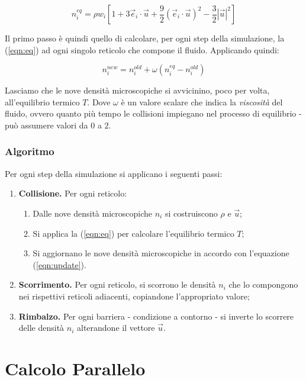 \documentclass[12pt]{article}
\begin{document}
\begin{equation}
\label{eqn:eq}
    n^{eq}_i = \rho w_i [1 + 3 \vec{e}_i \cdot \vec{u} + \frac{9}{2}(\vec{e}_i \cdot \vec{u})^2 - \frac{3}{2}|\vec{u}|^2] 
\end{equation}

Il primo passo è quindi quello di calcolare, per ogni step della simulazione, la (\ref{eqn:eq}) ad ogni singolo reticolo che compone il fluido.
Applicando quindi:

\begin{equation}
\label{eqn:update}
    n^{new}_i = n^{old}_i + \omega (n^{eq}_i - n^{old}_i)
\end{equation}

Lasciamo che le nove densità microscopiche si avvicinino, poco per volta, all'equilibrio termico \(T\).
Dove \(\omega\) è un valore scalare che indica la \textit{viscosità} del fluido, ovvero quanto più tempo le collisioni impiegano nel processo di equilibrio - può assumere valori da \(0\) a \(2\).



\subsubsection{Algoritmo}
\label{sec:alg}

Per ogni step della simulazione si applicano i seguenti passi:
\begin{enumerate}
    \item \textbf{Collisione.} Per ogni reticolo:
    \begin{enumerate}
        \item Dalle nove densità microscopiche \(n_i\) si costruiscono \(\rho\) e \(\vec{u}\);
        \item Si applica la (\ref{eqn:eq}) per calcolare l'equilibrio termico \(T\);
        \item Si aggiornano le nove densità microscopiche in accordo con l'equazione (\ref{eqn:update}). 
    \end{enumerate}
    \item \textbf{Scorrimento.} Per ogni reticolo, si scorrono le densità \(n_i\) che lo compongono nei rispettivi reticoli adiacenti, copiandone l'appropriato valore;
    \item \textbf{Rimbalzo.} Per ogni barriera - condizione a contorno - si inverte lo scorrere delle densità \(n_i\) alterandone il vettore \(\vec{u}\).
\end{enumerate}


\newpage
\section{Calcolo Parallelo}
\end{document}
